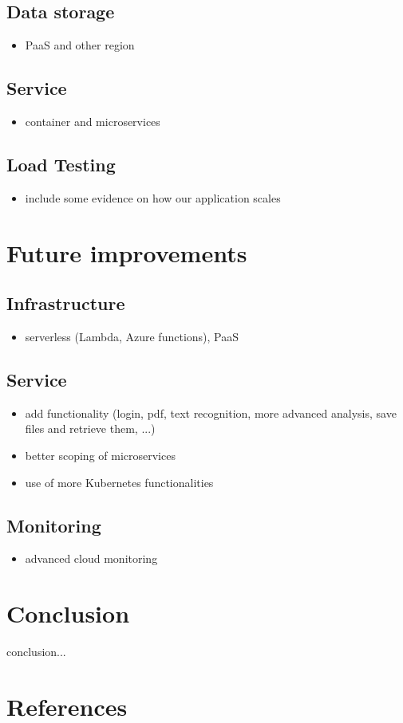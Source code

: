 \documentclass[conference]{IEEEtran}
\begin{document}
\subsection{Data storage}
\begin{itemize}
	\item PaaS and other region
\end{itemize}

\subsection{Service}
\begin{itemize}
	\item container and microservices
\end{itemize}

\subsection{Load Testing}
\begin{itemize}
	\item include some evidence on how our application scales
\end{itemize}

\section{Future improvements}
\subsection{Infrastructure}
\begin{itemize}
	\item serverless (Lambda, Azure functions),  PaaS
\end{itemize}

\subsection{Service}
\begin{itemize}
	\item add functionality (login, pdf, text recognition, more advanced analysis, save files and retrieve them, ...)
	\item better scoping of microservices
	\item use of more Kubernetes functionalities
\end{itemize}

\subsection{Monitoring}
\begin{itemize}
	\item advanced cloud monitoring
\end{itemize}

\section{Conclusion}
conclusion...

\section*{References}
\end{document}

